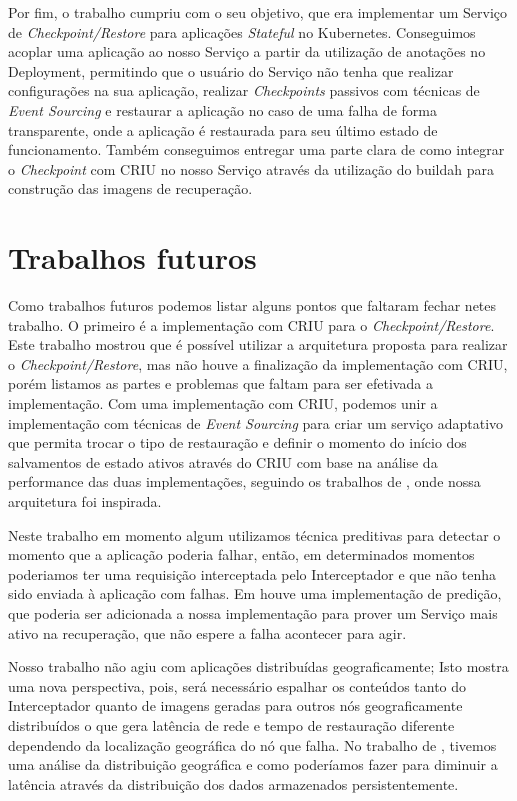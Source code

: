 	Por fim, o trabalho cumpriu com o seu objetivo, que era implementar um Serviço
	de \textit{Checkpoint/Restore} para aplicações \textit{Stateful} no Kubernetes.
	Conseguimos acoplar uma aplicação ao nosso Serviço a partir da utilização de
	anotações no Deployment, permitindo que o usuário do Serviço não tenha que
	realizar configurações na sua aplicação, realizar \textit{Checkpoints} passivos
	com técnicas de \textit{Event Sourcing} e restaurar a aplicação no caso de uma
	falha de forma transparente, onde a aplicação é restaurada para seu último estado
	de funcionamento. Também conseguimos entregar uma parte clara de como integrar o
	\textit{Checkpoint} com CRIU no nosso Serviço através da utilização do buildah
	para construção das imagens de recuperação.

\section{Trabalhos futuros}

Como trabalhos futuros podemos listar alguns pontos que faltaram fechar netes trabalho.
O primeiro é a implementação com CRIU para o \textit{Checkpoint/Restore}. Este trabalho
mostrou que é possível utilizar a arquitetura proposta para realizar o
\textit{Checkpoint/Restore}, mas não houve a finalização da implementação com CRIU,
porém listamos as partes e problemas que faltam para ser efetivada a implementação. Com
uma implementação com CRIU, podemos unir a implementação com técnicas de
\textit{Event Sourcing} para criar um serviço adaptativo que permita trocar o tipo de
restauração e definir o momento do início dos salvamentos de estado ativos através do
CRIU com base na análise da performance das duas implementações, seguindo os trabalhos
de \cite{muller2022architecture}, onde nossa arquitetura foi inspirada. 

Neste trabalho em momento algum utilizamos técnica preditivas para detectar o momento
que a aplicação poderia falhar, então, em determinados momentos poderiamos ter uma
requisição interceptada pelo Interceptador e que não tenha sido enviada à aplicação
com falhas. Em \cite{tran2022proactive} houve uma implementação de predição, que poderia
ser adicionada a nossa implementação para prover um Serviço mais ativo na recuperação,
que não espere a falha acontecer para agir.

Nosso trabalho não agiu com aplicações distribuídas geograficamente; Isto mostra uma
nova perspectiva, pois, será necessário espalhar os conteúdos tanto do Interceptador
quanto de imagens geradas para outros nós geograficamente distribuídos o que gera
latência de rede e tempo de restauração diferente dependendo da localização geográfica
do nó que falha. No trabalho de \cite{vayghan2021kubernetes}, tivemos uma análise da
distribuição geográfica e como poderíamos fazer para diminuir a latência através da
distribuição dos dados armazenados persistentemente.

